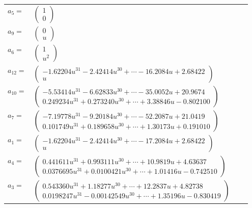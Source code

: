 \documentclass[1p]{elsarticle_modified}
\theoremstyle{definition}
\begin{document}
\begin{tabular}{m{7pt} m{180pt} m{7pt} m{180pt} }
\flushright $a_{5}=$&$\begin{pmatrix}1\\0\end{pmatrix}$ \\
\flushright $a_{9}=$&$\begin{pmatrix}0\\u\end{pmatrix}$ \\
\flushright $a_{6}=$&$\begin{pmatrix}1\\u^2\end{pmatrix}$ \\
\flushright $a_{12}=$&$\begin{pmatrix}-1.62204 u^{31}-2.42414 u^{30}+\cdots-16.2084 u+2.68422\\u\end{pmatrix}$ \\
\flushright $a_{10}=$&$\begin{pmatrix}-5.53414 u^{31}-6.62833 u^{30}+\cdots-35.0052 u+20.9674\\0.249234 u^{31}+0.273240 u^{30}+\cdots+3.38846 u-0.802100\end{pmatrix}$ \\
\flushright $a_{7}=$&$\begin{pmatrix}-7.19778 u^{31}-9.20184 u^{30}+\cdots-52.2087 u+21.0419\\0.101749 u^{31}+0.189658 u^{30}+\cdots+1.30173 u+0.191010\end{pmatrix}$ \\
\flushright $a_{1}=$&$\begin{pmatrix}-1.62204 u^{31}-2.42414 u^{30}+\cdots-17.2084 u+2.68422\\u\end{pmatrix}$ \\
\flushright $a_{4}=$&$\begin{pmatrix}0.441611 u^{31}+0.993111 u^{30}+\cdots+10.9819 u+4.63637\\0.0376695 u^{31}+0.0100421 u^{30}+\cdots+1.01416 u-0.742510\end{pmatrix}$ \\
\flushright $a_{3}=$&$\begin{pmatrix}0.543360 u^{31}+1.18277 u^{30}+\cdots+12.2837 u+4.82738\\0.0198247 u^{31}-0.00142549 u^{30}+\cdots+1.35196 u-0.830419\end{pmatrix}$ \\

\end{tabular}
\end{document}
